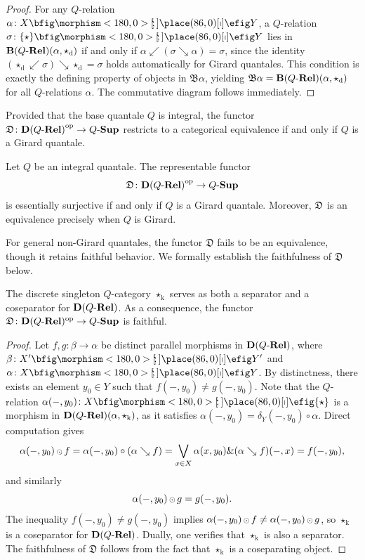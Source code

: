 \documentclass{tac}
\begin{document}
\begin{proof}
For any $Q$-relation $\alpha\colon X\nto Y$, a $Q$-relation $\sigma\colon\{\star\}\nto Y$ lies in $\mathbf{B}(Q\text{-}\mathbf{Rel})(\alpha,\star_\mathrm{d})$ if and only if $\alpha\swarrow(\sigma\searrow\alpha)=\sigma$, since the identity $(\star_\mathrm{d}\swarrow\sigma)\searrow\star_\mathrm{d}=\sigma$ holds automatically for Girard quantales. This condition is exactly the defining property of objects in $\mathfrak{B}\alpha$, yielding $\mathfrak{B}\alpha={\mathbf{B}(Q\text{-}\mathbf{Rel})}(\alpha,\star_\mathrm{d})$ for all $Q$-relations $\alpha$. The commutative diagram follows immediately.
\end{proof}

Provided that the base quantale $Q$ is integral, the functor $\mathfrak{D}\colon{\mathbf{D}(Q\text{-}\mathbf{Rel})}^{\mathrm{op}}\to{Q\text{-}\mathbf{Sup}}$ restricts to a categorical equivalence if and only if $Q$ is a Girard quantale.

\begin{proposition} \label{prop:ess-surj}
Let \(Q\) be an integral quantale. The representable functor
$$
\mathfrak{D}\colon {\mathbf{D}(Q\text{-}\mathbf{Rel})}^{\mathrm{op}}\to {Q\text{-}\mathbf{Sup}}
$$
is essentially surjective if and only if \(Q\) is a Girard quantale. Moreover, \(\mathfrak{D}\) is an equivalence precisely when \(Q\) is Girard.
\end{proposition}

For general non-Girard quantales, the functor $\mathfrak{D}$ fails to be an equivalence, though it retains faithful behavior. We formally establish the faithfulness of $\mathfrak{D}$ below.

\begin{proposition} \label{prop:faithful}
The discrete singleton $Q$-category $\star_\mathrm{k}$ serves as both a separator and a coseparator for $\mathbf{D}(Q\text{-}\mathbf{Rel})$. As a consequence, the functor $\mathfrak{D}\colon\mathbf{D}(Q\text{-}\mathbf{Rel})^{\mathrm{op}}\to{Q\text{-}\mathbf{Sup}}$ is faithful.
\end{proposition}

\begin{proof}
Let $f,g\colon\beta\to\alpha$ be distinct parallel morphisms in $\mathbf{D}(Q\text{-}\mathbf{Rel})$, where $\beta\colon X'\nto Y'$ and $\alpha\colon X\nto Y$. By distinctness, there exists an element $y_0\in Y$ such that $f(-,y_0)\neq g(-,y_0)$. Note that the $Q$-relation $\alpha(-,y_0)\colon X\nto\{\star\}$ is a morphism in $\mathbf{D}(Q\text{-}\mathbf{Rel})(\alpha,\star_\mathrm{k})$, as it satisfies $\alpha(-,y_0)=\delta_Y(-,y_0)\circ\alpha$. Direct computation gives
\[
\alpha(-,y_0){\,{\scriptstyle\odot}\,} f=\alpha(-,y_0)\circ(\alpha\searrow f)=\bigvee_{x\in X}\alpha(x,y_0)\&(\alpha\searrow f)(-,x)=f(-,y_0),
\]
and similarly
\[
\alpha(-,y_0){\,{\scriptstyle\odot}\,} g=g(-,y_0).
\]
The inequality $f(-,y_0)\neq g(-,y_0)$ implies $\alpha(-,y_0){\,{\scriptstyle\odot}\,} f\neq\alpha(-,y_0){\,{\scriptstyle\odot}\,} g$, so $\star_\mathrm{k}$ is a coseparator for $\mathbf{D}(Q\text{-}\mathbf{Rel})$. Dually, one verifies that $\star_\mathrm{k}$ is also a separator. The faithfulness of $\mathfrak{D}$ follows from the fact that $\star_\mathrm{k}$ is a coseparating object.
\end{proof}
\end{document}
